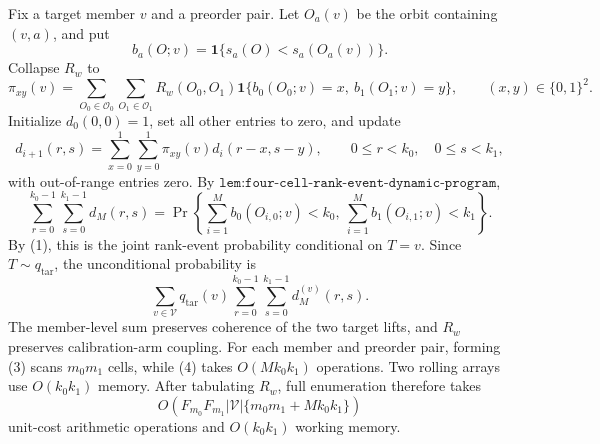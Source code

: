 Fix a target member \(v\) and a preorder pair. Let \(O_a(v)\) be the orbit containing \((v,a)\), and put
\[
b_a(O;v)=\mathbf 1\{s_a(O)<s_a(O_a(v))\}.
\]
Collapse \(R_w\) to
\[
\pi_{xy}(v)=\sum_{O_0\in\mathcal O_0}\sum_{O_1\in\mathcal O_1}R_w(O_0,O_1)
\mathbf 1\{b_0(O_0;v)=x,\ b_1(O_1;v)=y\},\qquad (x,y)\in\{0,1\}^2.
\tag{3}
\]
Initialize \(d_0(0,0)=1\), set all other entries to zero, and update
\[
d_{i+1}(r,s)=\sum_{x=0}^1\sum_{y=0}^1\pi_{xy}(v)d_i(r-x,s-y),
\qquad 0\le r<k_0,\quad 0\le s<k_1,
\tag{4}
\]
with out-of-range entries zero. By \(\texttt{lem:four-cell-rank-event-dynamic-program}\),
\[
\sum_{r=0}^{k_0-1}\sum_{s=0}^{k_1-1}d_M(r,s)
=\Pr\!\left\{\sum_{i=1}^M b_0(O_{i,0};v)<k_0,\ 
\sum_{i=1}^M b_1(O_{i,1};v)<k_1\right\}.
\tag{5}
\]
By (1), this is the joint rank-event probability conditional on \(T=v\). Since \(T\sim q_{\mathrm{tar}}\), the unconditional probability is
\[
\sum_{v\in\mathcal V}q_{\mathrm{tar}}(v)
\sum_{r=0}^{k_0-1}\sum_{s=0}^{k_1-1}d_M^{(v)}(r,s).
\tag{6}
\]
The member-level sum preserves coherence of the two target lifts, and \(R_w\) preserves calibration-arm coupling. For each member and preorder pair, forming (3) scans \(m_0m_1\) cells, while (4) takes \(O(Mk_0k_1)\) operations. Two rolling arrays use \(O(k_0k_1)\) memory. After tabulating \(R_w\), full enumeration therefore takes
\[
O\!\left(F_{m_0}F_{m_1}|\mathcal V|\{m_0m_1+Mk_0k_1\}\right)
\tag{7}
\]
unit-cost arithmetic operations and \(O(k_0k_1)\) working memory.

